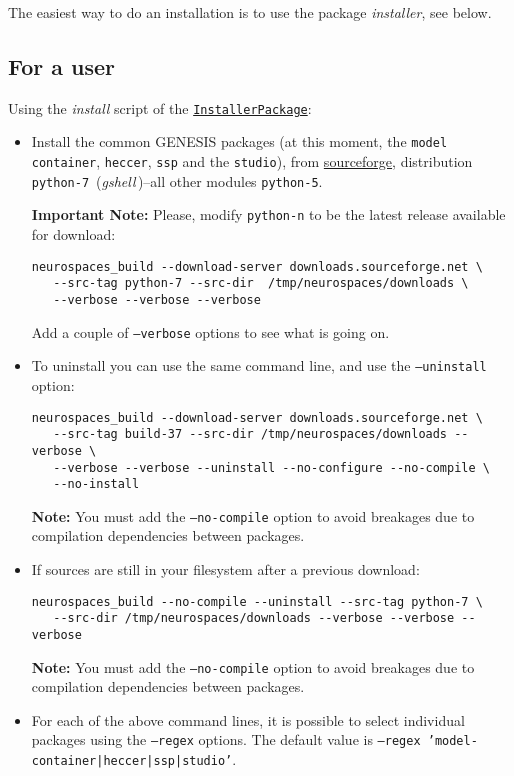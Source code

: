 \documentclass[12pt]{article}
\begin{document}
The easiest way to do an installation is to use the package {\it installer}, see below.

\subsection*{For a user}

Using the {\it install} script of the \href{../installer-package/installer-package.tex}{\tt InstallerPackage}:

\begin{itemize}
\item Install the common GENESIS packages (at this moment, the {\tt model container}, {\tt heccer}, {\tt ssp} and the {\tt studio}), from  \href{http://sourceforge.net/project/showfiles.php?group_id=162899}{sourceforge}, distribution {\tt python-7}\,\,\,({\it gshell\,})--all other modules {\tt python-5}.

{\bf Important Note:} Please, modify {\tt python-n} to be the latest release available for download:
\begin{verbatim}
neurospaces_build --download-server downloads.sourceforge.net \
   --src-tag python-7 --src-dir  /tmp/neurospaces/downloads \
   --verbose --verbose --verbose
\end{verbatim}
Add a couple of {\tt --verbose} options to see what is going on. 

\item To uninstall you can use the same command line, and use the {\tt --uninstall} option:
\begin{verbatim}
neurospaces_build --download-server downloads.sourceforge.net \
   --src-tag build-37 --src-dir /tmp/neurospaces/downloads --verbose \
   --verbose --verbose --uninstall --no-configure --no-compile \
   --no-install
\end{verbatim}
{\bf Note:} You must add the {\tt --no-compile} option to avoid breakages due to compilation dependencies between packages. 

\item If sources are still in your filesystem after a previous download:
\begin{verbatim}
neurospaces_build --no-compile --uninstall --src-tag python-7 \
   --src-dir /tmp/neurospaces/downloads --verbose --verbose --verbose
\end{verbatim}
{\bf Note:} You must add the {\tt --no-compile} option to avoid breakages due to compilation dependencies between packages. 

\item For each of the above command lines, it is possible to select individual packages using the {\tt --regex} options. The default value is {\tt --regex 'model-container|heccer|ssp|studio'}. 

\end{itemize}
\end{document}
